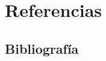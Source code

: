 \documentclass[11pt, a4paper, titlepage]{article}
\begin{document}

\newpage
\section{Referencias}
\subsection{Bibliografía}
\printbibliography

\end{document}
